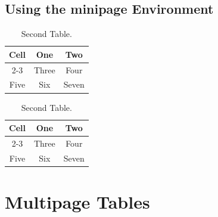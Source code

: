 \documentclass{article}
\begin{document}
	\subsection{Using the minipage Environment}
	\begin{table}[h]
		\centering
		\begin{minipage}[c]{0.31\linewidth}
			\caption{First Table.} \vspace{1mm}
			\begin{tabular}{|c|c|c|} 
			\hline
			\multirow{2}{*}{Cell}
				& One & Two \\
			\cline{2-3}
				& Three & Four \\
			\hline
			Five & Six & Seven \\
			\hline
			\end{tabular}
		\end{minipage} \hspace{1cm}
		\begin{minipage}[c]{0.31\linewidth}
			\caption{Second Table.} \vspace{1mm}
			\begin{tabular}{|c|c|c|} 
			\hline
			\multirow{2}{*}{Cell}
				& One & Two \\
			\cline{2-3}
				& Three & Four \\
			\hline
			Five & Six & Seven \\
			\hline
			\end{tabular}
		\end{minipage}
	\end{table}
	
	\pagebreak
	
	\kant[1-2] \kant[1]	
	
	\section{Multipage Tables}
	
\end{document}
